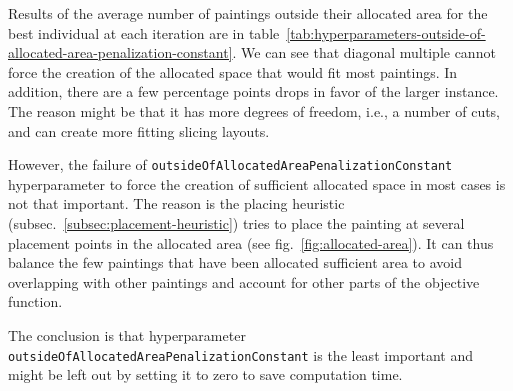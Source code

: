 Results of the average number of paintings outside their allocated area
for the best individual at each iteration are in table~\ref{tab:hyperparameters-outside-of-allocated-area-penalization-constant}.
We can see that diagonal multiple cannot force the creation of the allocated space that would fit most paintings.
In addition, there are a few percentage points drops in favor of the larger instance.
The reason might be that it has more degrees of freedom, i.e., a number of cuts,
and can create more fitting slicing layouts.

However, the failure of \verb|outsideOfAllocatedAreaPenalizationConstant| hyperparameter to force
the creation of sufficient allocated space in most cases is not that important.
The reason is the placing heuristic (subsec.~\ref{subsec:placement-heuristic})
tries to place the painting at several placement points in the allocated area (see fig.~\ref{fig:allocated-area}).
It can thus balance the few paintings that have been allocated sufficient area to avoid overlapping with other paintings
and account for other parts of the objective function.

The conclusion is that hyperparameter \verb|outsideOfAllocatedAreaPenalizationConstant| is the least
important and might be left out by setting it to zero to save computation time.

